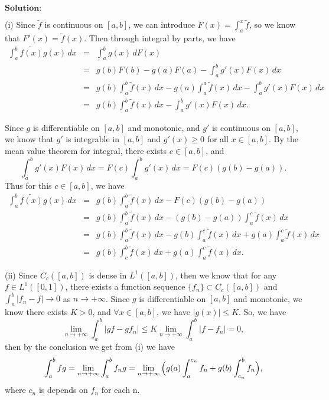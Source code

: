 \documentclass[12pt]{article}
\begin{document}
\vspace{8pt}
$\textbf{Solution:}$

(i) Since $\tilde{f}$ is continuous on $[a, b]$, we can introduce $F(x) = \int_{a}^{x} \tilde{f}$, so we know that $F'(x) = \tilde{f}(x)$. Then through integral by parts, we have 
\begin{eqnarray*}
\int_{a}^{b} \tilde{f(x)} g(x) \, d x & = & \int_{a}^{b} g(x) \, d F(x) \\
& = & g(b) F(b) - g(a) F(a) - \int_{a}^{b} g'(x) F(x) \, d x  \\
& = & g(b) \int_{a}^{b} \tilde{f} (x) \, d x - g(a) \int_{a}^{a} \tilde{f} (x) \, d x - \int_{a}^{b} g'(x) F(x) \, d x  \\
& = &  g(b) \int_{a}^{b} \tilde{f} (x) \, d x - \int_{a}^{b} g'(x) F(x) \, d x.
\end{eqnarray*}

Since $g$ is differentiable on $[a, b]$ and monotonic, and $g'$ is continuous on $[a, b]$, we know that $g'$ is integrable in $[a, b]$ and $g'(x) \geq 0$ for all $x \in [a, b]$. By the mean value theorem for integral, there exists $c \in [a, b]$, and
\begin{equation*}
   \int_{a}^{b} g'(x) F(x) \, d x = F(c) \int_{a}^{b} g'(x) \, d x = F(c) (g(b) - g(a)).
\end{equation*}
Thus for this $c \in [a, b]$, we have
\begin{eqnarray*}
\int_{a}^{b} \tilde{f(x)} g(x) \, d x & = & g(b) \int_{a}^{b} \tilde{f} (x) \, d x - F(c) (g(b) - g(a)) \\
& = & g(b) \int_{a}^{b} \tilde{f} (x) \, d x - (g(b) - g(a)) \int_{a}^{c} \tilde{f} (x) \, d x \\
& = & g(b) \int_{a}^{b} \tilde{f} (x) \, d x - g(b) \int_{a}^{c} \tilde{f} (x) \, d x + g(a) \int_{a}^{c} \tilde{f} (x) \, d x  \\
& = &  g(b) \int_{c}^{b} \tilde{f} (x) \, d x + g(a) \int_{a}^{c} \tilde{f} (x) \, d x.
\end{eqnarray*}

(ii) Since $C_{c}([a, b])$ is dense in $L^{1}([a, b])$, then we know that for any $f \in L^{1}([0, 1])$, there exists a function sequence $\{f_{n}\} \subset C_{c}([a, b])$ and $\int_{a}^{b} |f_{n} - f| \to 0$ as $n \to + \infty$.
Since $g$ is differentiable on $[a,b]$ and monotonic, we know there exists $K > 0$, and $\forall x \in [a, b]$, we have $|g(x)| \leq K$. So, we have
\begin{equation*}
   \lim_{n \to + \infty} \int_{a}^{b} |g f - g f_{n}| \leq K \lim_{n \to + \infty} \int_{a}^{b}|f - f_{n}| = 0,
\end{equation*}
then by the conclusion we get from (i) we have
\begin{equation*}
   \int_{a}^{b} f g = \lim_{n \to + \infty} \int_{a}^{b} f_{n} g = \lim_{n \to + \infty} \Big{(} g(a) \int_{a}^{c_{n}} f_{n} + g(b) \int_{c_{n}}^{b} f_{n} \Big{)},
\end{equation*}
where $c_{n}$ is depends on $f_{n}$ for each n.
\end{document}
